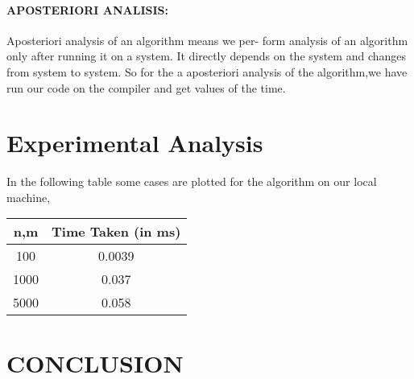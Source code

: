\documentclass[10pt]{article}
\begin{document}
\begin{multicols*}{2}
\paragraph{APOSTERIORI ANALISIS:}
Aposteriori analysis of an algorithm means we per- form analysis of an algorithm only after running it on a system. It directly depends on the system and changes from system to system. So for the a aposteriori analysis of the algorithm,we have run our code on the compiler and get values of the time.
\section*{Experimental Analysis}
In the following table some cases are plotted for the algorithm on our local machine,
\begin{center}
 \begin{tabular}{||c | c||} 
 \hline
 n,m & Time Taken (in ms) \\ [0.5ex] 
 \hline\hline
 
 100 & 0.0039 \\
 \hline
 1000 & 0.037 \\
 \hline
 5000 & 0.058 \\ [1ex] 
 \hline
 
\end{tabular}
\end{center}


\section*{CONCLUSION}


\end{multicols*}
\end{document}

